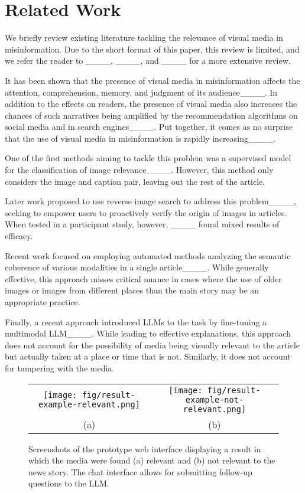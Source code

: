 \section{Related Work}
We briefly review existing literature tackling the relevance of visual media in misinformation. Due to the short format of this paper, this review is limited, and we refer the reader to ____, ____, and ____ for a more extensive review.

It has been shown that the presence of visual media in misinformation affects the attention, comprehension, memory, and judgment of its audience____. In addition to the effects on readers, the presence of visual media also increases the chances of such narratives being amplified by the recommendation algorithms on social media and in search engines____. Put together, it comes as no surprise that the use of visual media in misinformation is rapidly increasing____.

One of the first methods aiming to tackle this problem was a supervised model for the classification of image relevance____. However, this method only considers the image and caption pair, leaving out the rest of the article.

Later work proposed to use reverse image search to address this problem____, seeking to empower users to proactively verify the origin of images in articles. When tested in a participant study, however, ____ found mixed results of efficacy.

Recent work focused on employing automated methods analyzing the semantic coherence of various modalities in a single article____. While generally effective, this approach misses critical nuance in cases where the use of older images or images from different places than the main story may be an appropriate practice.

Finally, a recent approach introduced LLMs to the task by fine-tuning a multimodal LLM____. While leading to effective explanations, this approach does not account for the possibility of media being visually relevant to the article but actually taken at a place or time that is not. Similarly, it does not account for tampering with the media.

\begin{figure*}[t] %
    \centering
    \begin{tabular}{cc}
        \texttt{[image: fig/result-example-relevant.png]} &
        \texttt{[image: fig/result-example-not-relevant.png]} \\
        (a) & (b)
    \end{tabular}
    \caption{
    Screenshots of the prototype web interface displaying a result in which the media were found (a) relevant and (b) not relevant to the news story. The chat interface allows for submitting follow-up questions to the LLM.
    }
    \label{fig:result}
\end{figure*}